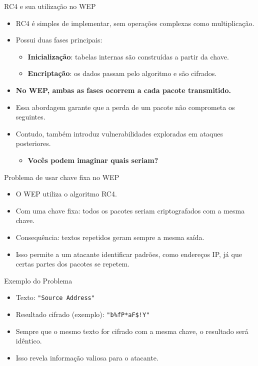\begin{frame}{RC4 e sua utilização no WEP}
    \begin{itemize}
        \item RC4 é simples de implementar, sem operações complexas como multiplicação.  
        \item Possui duas fases principais:
        \begin{itemize}
            \item \textbf{Inicialização}: tabelas internas são construídas a partir da chave.  
            \item \textbf{Encriptação}: os dados passam pelo algoritmo e são cifrados.  
        \end{itemize}
        \item \textbf{No WEP, ambas as fases ocorrem a cada pacote transmitido.}  
        \item Essa abordagem garante que a perda de um pacote não comprometa os seguintes.  
        \item Contudo, também introduz vulnerabilidades exploradas em ataques posteriores.  
        \begin{itemize}
            \item \textbf{Vocês podem imaginar quais seriam?}
        \end{itemize}
    \end{itemize}
\end{frame}


\begin{frame}{Problema de usar chave fixa no WEP}
    \begin{itemize}
        \item O WEP utiliza o algoritmo RC4.
        \item Com uma chave fixa: todos os pacotes seriam criptografados com a mesma chave.
        \item Consequência: textos repetidos geram sempre a mesma saída.
        \item Isso permite a um atacante identificar padrões, como endereços IP,
              já que certas partes dos pacotes se repetem.
    \end{itemize}

\begin{block}{Exemplo do Problema}
    \begin{itemize}
        \item Texto: \texttt{"Source Address"}
        \item Resultado cifrado (exemplo): \texttt{"b\%fP*aF\$!Y"}
        \item Sempre que o mesmo texto for cifrado com a mesma chave, o resultado será idêntico.
        \item Isso revela informação valiosa para o atacante.
    \end{itemize}
\end{block}
\end{frame}

